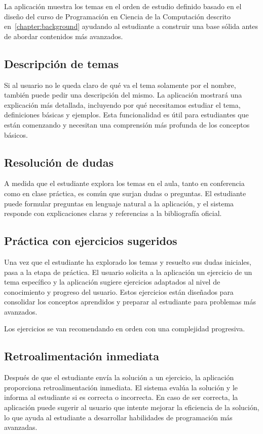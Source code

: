 \documentclass{article}
\begin{document}
La aplicación muestra los temas en el orden de estudio definido basado en el diseño del curso de Programación en Ciencia de la Computación descrito en~\ref{chapter:background} ayudando al estudiante a construir una base sólida antes de abordar contenidos más avanzados.

\subsection{Descripción de temas}

Si al usuario no le queda claro de qué va el tema solamente por el nombre, también puede pedir una descripción del mismo. La aplicación mostrará una explicación más detallada, incluyendo por qué necesitamos estudiar el tema, definiciones básicas y ejemplos. Esta funcionalidad es útil para estudiantes que están comenzando y necesitan una comprensión más profunda de los conceptos básicos.

\subsection{Resolución de dudas}
A medida que el estudiante explora los temas en el aula, tanto en conferencia como en clase práctica, es común que surjan dudas o preguntas. El estudiante puede formular preguntas en lenguaje natural a la aplicación, y el sistema responde con explicaciones claras y referencias a la bibliografía oficial.

\subsection{Práctica con ejercicios sugeridos}
Una vez que el estudiante ha explorado los temas y resuelto sus dudas iniciales, pasa a la etapa de práctica. El usuario solicita a la aplicación un ejercicio de un tema específico y la aplicación sugiere ejercicios adaptados al nivel de conocimiento y progreso del usuario. Estos ejercicios están diseñados para consolidar los conceptos aprendidos y preparar al estudiante para problemas más avanzados.

Los ejercicios se van recomendando en orden con una complejidad progresiva.

\subsection{Retroalimentación inmediata}
Después de que el estudiante envía la solución a un ejercicio, la aplicación proporciona retroalimentación inmediata. El sistema evalúa la solución y le informa al estudiante si es correcta o incorrecta. En caso de ser correcta, la aplicación puede sugerir al usuario que intente mejorar la eficiencia de la solución, lo que ayuda al estudiante a desarrollar habilidades de programación más avanzadas.
\end{document}
